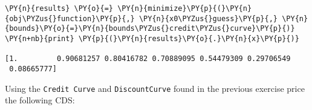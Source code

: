 \begin{Answer}
\begin{tcolorbox}[size=fbox, boxrule=1pt,colback=cellbackground, colframe=cellborder]
\begin{Verbatim}[commandchars=\\\{\}]
\PY{n}{results} \PY{o}{=} \PY{n}{minimize}\PY{p}{(}\PY{n}{obj\PYZus{}function}\PY{p}{,} \PY{n}{x0\PYZus{}guess}\PY{p}{,} \PY{n}{bounds}\PY{o}{=}\PY{n}{bounds\PYZus{}credit\PYZus{}curve}\PY{p}{)}
\PY{n+nb}{print} \PY{p}{(}\PY{n}{results}\PY{o}{.}\PY{n}{x}\PY{p}{)}

[1.         0.90681257 0.80416782 0.70889095 0.54479309 0.29706549
 0.08665777]
\end{Verbatim}  
\end{tcolorbox}
\end{Answer}

\begin{Exercise}
Using the \texttt{Credit\ Curve} and \texttt{DiscountCurve} found in the previous exercise price the following CDS:

\begin{Shaded}
\begin{Highlighting}[]
\OperatorTok{=}\NormalTok{ [}
\NormalTok{    \{}\NormalTok{: }\NormalTok{, }\NormalTok{: }\NormalTok{, }\NormalTok{: }\NormalTok{\},}
\NormalTok{    \{}\NormalTok{: }\NormalTok{, }\NormalTok{: }\NormalTok{, }\NormalTok{: }\NormalTok{\},}
\NormalTok{    \{}\NormalTok{: }\NormalTok{, }\NormalTok{: }\NormalTok{, }\NormalTok{: }\NormalTok{\},}
\NormalTok{    \{}\NormalTok{: }\NormalTok{, }\NormalTok{: }\NormalTok{, }\NormalTok{: }\NormalTok{\},}
\NormalTok{    \{}\NormalTok{: }\NormalTok{, }\NormalTok{: }\NormalTok{, }\NormalTok{: }\NormalTok{\},}
\NormalTok{    \{}\NormalTok{: }\NormalTok{, }\NormalTok{: }\NormalTok{, }\NormalTok{: }\NormalTok{\},}
\NormalTok{    \{}\NormalTok{: }\NormalTok{, }\NormalTok{: }\NormalTok{, }\NormalTok{: }\NormalTok{\},}
\NormalTok{    \{}\NormalTok{: }\NormalTok{, }\NormalTok{: }\NormalTok{, }\NormalTok{: }\NormalTok{\},}
\NormalTok{    \{}\NormalTok{: }\NormalTok{, }\NormalTok{: }\NormalTok{, }\NormalTok{: }\NormalTok{\}}
\NormalTok{]}
\end{Highlighting}
\end{Shaded}
\end{Exercise}

